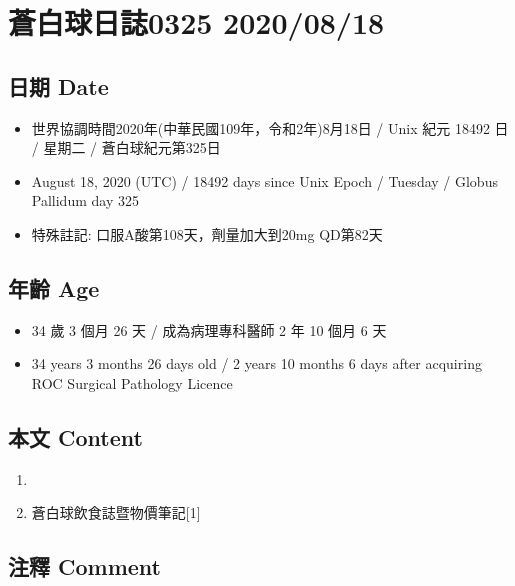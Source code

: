 \documentclass[
]{article}
\providecommand{\tightlist}{%
  \setlength{\itemsep}{0pt}\setlength{\parskip}{0pt}}
\begin{document}
\hypertarget{ux84bcux767dux7403ux65e5ux8a8c0325-20200818}{%
\section{蒼白球日誌0325
2020/08/18}\label{ux84bcux767dux7403ux65e5ux8a8c0325-20200818}}

\hypertarget{ux65e5ux671f-date-17}{%
\subsection{日期 Date}\label{ux65e5ux671f-date-17}}

\begin{itemize}
\tightlist
\item
  世界協調時間2020年(中華民國109年，令和2年)8月18日 / Unix 紀元 18492 日
  / 星期二 / 蒼白球紀元第325日
\item
  August 18, 2020 (UTC) / 18492 days since Unix Epoch / Tuesday / Globus
  Pallidum day 325
\item
  特殊註記: 口服A酸第108天，劑量加大到20mg QD第82天
\end{itemize}

\hypertarget{ux5e74ux9f61-age-17}{%
\subsection{年齡 Age}\label{ux5e74ux9f61-age-17}}

\begin{itemize}
\tightlist
\item
  34 歲 3 個月 26 天 / 成為病理專科醫師 2 年 10 個月 6 天
\item
  34 years 3 months 26 days old / 2 years 10 months 6 days after
  acquiring ROC Surgical Pathology Licence
\end{itemize}

\hypertarget{ux672cux6587-content-17}{%
\subsection{本文 Content}\label{ux672cux6587-content-17}}

\begin{enumerate}
\def\labelenumi{\arabic{enumi}.}
\tightlist
\item
\item
  蒼白球飲食誌暨物價筆記{[}1{]}
\end{enumerate}

\hypertarget{ux6ce8ux91cb-comment-17}{%
\subsection{注釋 Comment}\label{ux6ce8ux91cb-comment-17}}
\end{document}
